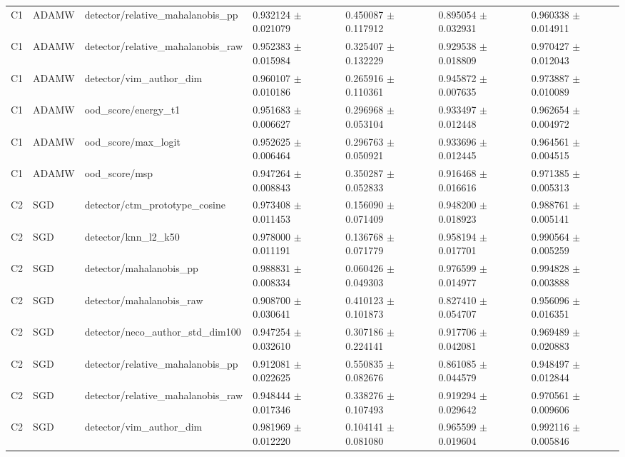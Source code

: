 \begin{longtable}{lllllll}
C1 & ADAMW & detector/relative\_mahalanobis\_pp & 0.932124 $\pm$ 0.021079 & 0.450087 $\pm$ 0.117912 & 0.895054 $\pm$ 0.032931 & 0.960338 $\pm$ 0.014911 \\
C1 & ADAMW & detector/relative\_mahalanobis\_raw & 0.952383 $\pm$ 0.015984 & 0.325407 $\pm$ 0.132229 & 0.929538 $\pm$ 0.018809 & 0.970427 $\pm$ 0.012043 \\
C1 & ADAMW & detector/vim\_author\_dim & 0.960107 $\pm$ 0.010186 & 0.265916 $\pm$ 0.110361 & 0.945872 $\pm$ 0.007635 & 0.973887 $\pm$ 0.010089 \\
C1 & ADAMW & ood\_score/energy\_t1 & 0.951683 $\pm$ 0.006627 & 0.296968 $\pm$ 0.053104 & 0.933497 $\pm$ 0.012448 & 0.962654 $\pm$ 0.004972 \\
C1 & ADAMW & ood\_score/max\_logit & 0.952625 $\pm$ 0.006464 & 0.296763 $\pm$ 0.050921 & 0.933696 $\pm$ 0.012445 & 0.964561 $\pm$ 0.004515 \\
C1 & ADAMW & ood\_score/msp & 0.947264 $\pm$ 0.008843 & 0.350287 $\pm$ 0.052833 & 0.916468 $\pm$ 0.016616 & 0.971385 $\pm$ 0.005313 \\
C2 & SGD & detector/ctm\_prototype\_cosine & 0.973408 $\pm$ 0.011453 & 0.156090 $\pm$ 0.071409 & 0.948200 $\pm$ 0.018923 & 0.988761 $\pm$ 0.005141 \\
C2 & SGD & detector/knn\_l2\_k50 & 0.978000 $\pm$ 0.011191 & 0.136768 $\pm$ 0.071779 & 0.958194 $\pm$ 0.017701 & 0.990564 $\pm$ 0.005259 \\
C2 & SGD & detector/mahalanobis\_pp & 0.988831 $\pm$ 0.008334 & 0.060426 $\pm$ 0.049303 & 0.976599 $\pm$ 0.014977 & 0.994828 $\pm$ 0.003888 \\
C2 & SGD & detector/mahalanobis\_raw & 0.908700 $\pm$ 0.030641 & 0.410123 $\pm$ 0.101873 & 0.827410 $\pm$ 0.054707 & 0.956096 $\pm$ 0.016351 \\
C2 & SGD & detector/neco\_author\_std\_dim100 & 0.947254 $\pm$ 0.032610 & 0.307186 $\pm$ 0.224141 & 0.917706 $\pm$ 0.042081 & 0.969489 $\pm$ 0.020883 \\
C2 & SGD & detector/relative\_mahalanobis\_pp & 0.912081 $\pm$ 0.022625 & 0.550835 $\pm$ 0.082676 & 0.861085 $\pm$ 0.044579 & 0.948497 $\pm$ 0.012844 \\
C2 & SGD & detector/relative\_mahalanobis\_raw & 0.948444 $\pm$ 0.017346 & 0.338276 $\pm$ 0.107493 & 0.919294 $\pm$ 0.029642 & 0.970561 $\pm$ 0.009606 \\
C2 & SGD & detector/vim\_author\_dim & 0.981969 $\pm$ 0.012220 & 0.104141 $\pm$ 0.081080 & 0.965599 $\pm$ 0.019604 & 0.992116 $\pm$ 0.005846 \\

\end{longtable}
